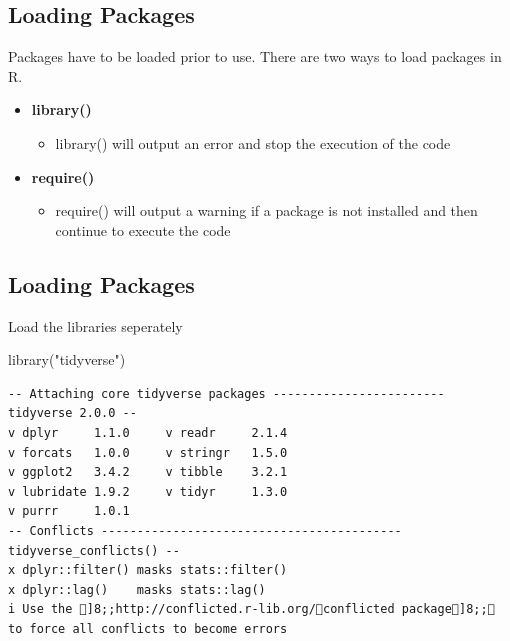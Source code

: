 \documentclass[
  letterpaper,
  DIV=11,
  numbers=noendperiod,
  landscape]{scrartcl}
\newenvironment{Shaded}{\begin{snugshade}}{\end{snugshade}}
\newcommand{\FunctionTok}[1]{\textcolor[rgb]{0.28,0.35,0.67}{#1}}
\newcommand{\NormalTok}[1]{\textcolor[rgb]{0.00,0.23,0.31}{#1}}
\newcommand{\StringTok}[1]{\textcolor[rgb]{0.13,0.47,0.30}{#1}}
\providecommand{\tightlist}{%
  \setlength{\itemsep}{0pt}\setlength{\parskip}{0pt}}\usepackage{longtable,booktabs,array}
\begin{document}
\hypertarget{loading-packages}{%
\subsection{Loading Packages}\label{loading-packages}}

Packages have to be loaded prior to use. There are two ways to load
packages in R.

\begin{itemize}
\tightlist
\item
  \textbf{library()}

  \begin{itemize}
  \tightlist
  \item
    library() will output an error and stop the execution of the code
  \end{itemize}
\item
  \textbf{require()}

  \begin{itemize}
  \tightlist
  \item
    require() will output a warning if a package is not installed and
    then continue to execute the code
  \end{itemize}
\end{itemize}

\hypertarget{loading-packages-1}{%
\subsection{Loading Packages}\label{loading-packages-1}}

Load the libraries seperately

\begin{Shaded}
\begin{Highlighting}[]
\FunctionTok{library}\NormalTok{(}\StringTok{"tidyverse"}\NormalTok{)}
\end{Highlighting}
\end{Shaded}

\begin{verbatim}
-- Attaching core tidyverse packages ------------------------ tidyverse 2.0.0 --
v dplyr     1.1.0     v readr     2.1.4
v forcats   1.0.0     v stringr   1.5.0
v ggplot2   3.4.2     v tibble    3.2.1
v lubridate 1.9.2     v tidyr     1.3.0
v purrr     1.0.1     
-- Conflicts ------------------------------------------ tidyverse_conflicts() --
x dplyr::filter() masks stats::filter()
x dplyr::lag()    masks stats::lag()
i Use the ]8;;http://conflicted.r-lib.org/conflicted package]8;; to force all conflicts to become errors
\end{verbatim}
\end{document}
